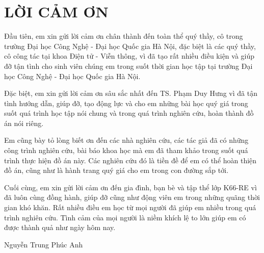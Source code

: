 \chapter*{LỜI CẢM ƠN}
\fontsize{13}{15}\selectfont

Đầu tiên, em xin gửi lời cảm ơn chân thành đến toàn thể quý thầy, cô trong trường Đại học Công Nghệ - Đại học Quốc gia Hà Nội, đặc biệt là các quý thầy, cô công tác tại khoa Điện tử - Viễn thông, vì đã tạo rất nhiều điều kiện và giúp đỡ tận tình cho sinh viên chúng em trong suốt thời gian học tập tại trường Đại học Công Nghệ - Đại học Quốc gia Hà Nội.

Đặc biệt, em xin gửi lời cảm ơn sâu sắc nhất đến TS. Phạm Duy Hưng  vì đã tận tình hướng dẫn, giúp đỡ, tạo động lực và cho em những bài học quý giá trong suốt quá trình học tập nói chung và trong quá trình nghiên cứu, hoàn thành đồ án nói riêng.

Em cũng bày tỏ lòng biết ơn đến các nhà nghiên cứu, các tác giả đã có những công trình nghiên cứu, bài báo khoa học mà em đã tham khảo trong suốt quá trình thực hiện đồ án này. Các nghiên cứu đó là tiền đề để em có thể hoàn thiện đồ án, cũng như là hành trang quý giá cho em trong con đường sắp tới.

Cuối cùng, em xin gửi lời cảm ơn đến gia đình, bạn bè và tập thể lớp K66-RE vì đã luôn cùng đồng hành, giúp đỡ cũng như động viên em trong những quãng thời gian khó khăn. Rất nhiều điều em học từ mọi người đã giúp em nhiều trong quá trình nghiên cứu. Tình cảm của mọi người là niềm khích lệ to lớn giúp em có được thành quả như ngày hôm nay.




\vspace{2cm}
\begin{flushright}
    Nguyễn Trung Phúc Anh\hspace*{1.3cm}
\end{flushright}